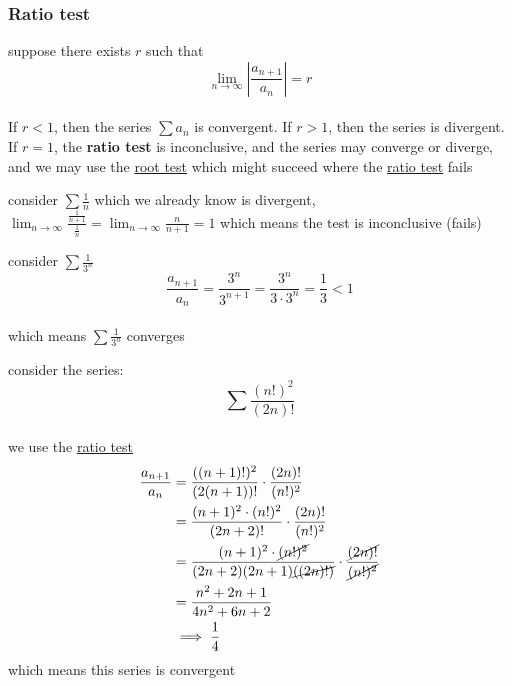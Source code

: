 \documentclass[a4paper,12pt]{article}
\newcommand{\?}{\stackrel{?}{=}}
\begin{document}
\subsubsection{Ratio test}
\label{sec:orgcc05a6d}
\begin{definition}
suppose there exists \(r\) such that\\[0pt]
\[
  \lim_{n\to\infty} \left|\frac{a_{n+1}}{a_n}\right| = r
\]\\[0pt]
If \(r < 1\), then the series \(\sum a_n\) is convergent. If \(r > 1\), then the series is divergent. If \(r = 1\), the \textbf{ratio test} is inconclusive, and the series may converge or diverge, and we may use the \hyperref[sec:org88b6001]{root test} which might succeed where the \hyperref[sec:orgcc05a6d]{ratio test} fails\\[0pt]

\begin{my_example}
consider \(\sum \frac1n\) which we already know is divergent, \(\lim_{n\to\infty} \frac{\frac{1}{n+1}}{\frac{1}{n}} = \lim_{n\to\infty} \frac{n}{n+1} = 1\) which means the test is inconclusive (fails)\\[0pt]
\end{my_example}

\begin{my_example}
consider \(\sum \frac{1}{3^n}\)\\[0pt]
\[
  \frac{a_{n+1}}{a_n} = \frac{3^n}{3^{n+1}} = \frac{3^n}{3 \cdot 3^n} = \frac13 < 1
\]\\[0pt]
which means \(\sum \frac{1}{3^n}\) converges\\[0pt]
\end{my_example}

\begin{my_example}
consider the series:\\[0pt]
\[
  \sum \frac{(n!)^2}{(2n)!}
\]\\[0pt]
we use the \hyperref[sec:orgcc05a6d]{ratio test}\\[0pt]
\begin{align*}
  \frac{a_{n+1}}{a_n} &= \frac{((n+1)!)^2}{(2(n+1))!} \cdot \frac{(2n)!}{(n!)^2}\\
  &= \frac{(n+1)^2 \cdot (n!)^2}{(2n+2)!} \cdot \frac{(2n)!}{(n!)^2}\\
  &= \frac{(n+1)^2 \cdot \cancel{(n!)^2}}{(2n+2)(2n+1)\cancel{((2n)!)}} \cdot \frac{\cancel{(2n)!}}{\cancel{(n!)^2}}\\
  &= \frac{n^2+2n+1}{4n^2+6n+2}\\
  &\implies \frac14
\end{align*}
which means this series is convergent\\[0pt]
\end{my_example}


\end{definition}
\end{document}
